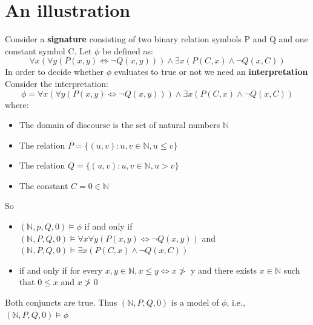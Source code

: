 \documentclass{article}[18pt]
\begin{document}
\section{An illustration}
Consider a \textbf{signature} consisting of two binary relation symbols P and Q and one constant symbol C. Let $\phi$ be defined as:
$$\forall x ( \forall y ( P ( x , y ) \Leftrightarrow \neg Q ( x , y ) ) ) \wedge \exists x ( P ( C , x ) \wedge \neg Q ( x , C ) )$$
In order to decide whether $\phi$ evaluates to true or not we need an \textbf{interpretation}\\
Consider the interpretation:
$$\phi = \forall x ( \forall y ( P ( x , y ) \Leftrightarrow \neg Q ( x , y ) ) ) \wedge \exists x ( P ( C , x ) \wedge \neg Q ( x , C ) )$$
where:
\begin{itemize}
\item The domain of discourse is the set of natural numbers $\mathbb{N}$
\item The relation $P = \{ ( u , v ) : u , v \in \mathbb { N } , u \leq v \}$
\item The relation $Q = \{ ( u , v ) : u , v \in \mathbb { N } , u > v \}$
\item The constant $C=0\in \mathbb{ N }$
\end{itemize}
So
\begin{itemize}
\item $(\mathbb{ N },p,Q,0)\models \phi$ if and only if\\
$( \mathbb { N } , P , Q , 0 ) \models \forall x \forall y ( P ( x , y ) \Leftrightarrow \neg Q ( x , y ) )$ and $( \mathbb { N } , P , Q , 0 ) \models \exists x ( P ( C , x ) \wedge \neg Q ( x , C ) )$
\item if and only if for every $x,y \in \mathbb{ N }, x\leqslant y \Leftrightarrow x\ngtr$ y and there exists $x\in \mathbb{ N }$ such that $0\leqslant x$ and $x\ngtr 0$
\end{itemize}
Both conjuncts are true. Thus $(\mathbb{ N },P,Q,0)$ is a model of $\phi$, i.e., $(\mathbb{ N },P,Q,0)\models \phi$
\end{document}
